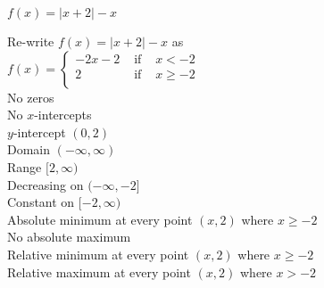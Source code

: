{$f(x) = |x+2| - x$}
{Re-write $f(x) = |x+2| - x$ as \\ ${\displaystyle f(x) = \left\{ \begin{array}{rcl}
-2x-2 & \mbox{ if } & x < -2\\
     2 & \mbox{ if } & x \geq -2 \\ \end{array} \right. }$ \\ No zeros \\ No $x$-intercepts  \\ $y$-intercept $(0,2)$ \\ Domain $(-\infty, \infty)$ \\ Range $[2, \infty)$ \\ Decreasing on $(-\infty, -2]$ \\ Constant on $[-2,\infty)$ \\ Absolute minimum at every point $(x,2)$ where $x \geq -2$ \\ No absolute maximum \\ Relative minimum at every point $(x, 2)$ where $x \geq -2$ \\ Relative maximum at every point $(x, 2)$ where $x > -2$ 

\begin{center}
\end{center}}